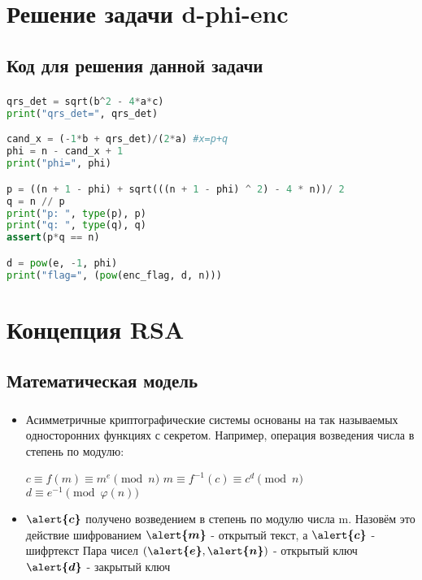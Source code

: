 \documentclass[t]{beamer}
\begin{document}
\section{Решение задачи d-phi-enc}
\subsection{Код для решения данной задачи}
\begin{frame}[fragile]
	\frametitle{\insertsection} 
	\framesubtitle{\insertsubsection}
	\footnotesize
	\smaller
\begin{lstlisting}[language=Python]
qrs_det = sqrt(b^2 - 4*a*c)
print("qrs_det=", qrs_det)

cand_x = (-1*b + qrs_det)/(2*a) #x=p+q
phi = n - cand_x + 1
print("phi=", phi)

p = ((n + 1 - phi) + sqrt(((n + 1 - phi) ^ 2) - 4 * n))/ 2
q = n // p
print("p: ", type(p), p)
print("q: ", type(q), q)
assert(p*q == n)

d = pow(e, -1, phi)
print("flag=", (pow(enc_flag, d, n)))
\end{lstlisting}	
\end{frame}
\section{Концепция RSA}
\subsection{Математическая модель}

\begin{frame}[t] %
	\frametitle{\insertsection}
	\framesubtitle{\insertsubsection}
	\begin{itemize}
		\item<1-> Асимметричные криптографические системы основаны на так называемых односторонних функциях с секретом.\newline 
		Например, операция возведения числа в степень по модулю: \newline 
		\begin{center} \( c\equiv f(m) \equiv m^e \pmod{n} \) \newline
		\( m\equiv f^{-1}(c) \equiv c^d \pmod{n} \) \newline 
		\( d\equiv e^{-1} \pmod{\varphi(n)} \) \newline \end{center}
		\item<2-> $\boldsymbol{\alert{c}}$ получено возведением в степень по модулю числа m. Назовём это действие шифрованием
		\newline 
		$\boldsymbol{\alert{m}}$ - открытый текст, а $\boldsymbol{\alert{c}}$ - шифртекст
		\newline 
		Пара чисел $(\boldsymbol{\alert{e}}, \boldsymbol{\alert{n}})$ - открытый ключ
		\newline
		$\boldsymbol{\alert{d}}$ - закрытый ключ 
	\end{itemize}
\end{frame}
\end{document}
